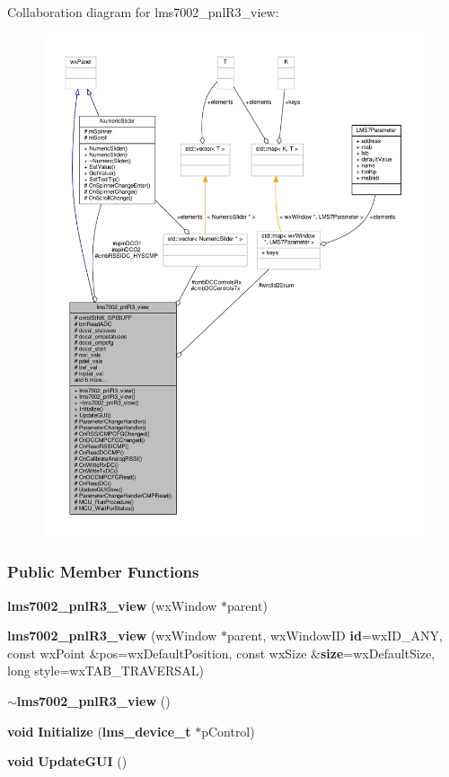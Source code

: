 Collaboration diagram for lms7002\+\_\+pnl\+R3\+\_\+view\+:
\nopagebreak
\begin{figure}[H]
\begin{center}
\leavevmode
\includegraphics[width=350pt]{d9/da1/classlms7002__pnlR3__view__coll__graph}
\end{center}
\end{figure}
\subsubsection*{Public Member Functions}
\begin{DoxyCompactItemize}
\item 
{\bf lms7002\+\_\+pnl\+R3\+\_\+view} (wx\+Window $\ast$parent)
\item 
{\bf lms7002\+\_\+pnl\+R3\+\_\+view} (wx\+Window $\ast$parent, wx\+Window\+ID {\bf id}=wx\+I\+D\+\_\+\+A\+NY, const wx\+Point \&pos=wx\+Default\+Position, const wx\+Size \&{\bf size}=wx\+Default\+Size, long style=wx\+T\+A\+B\+\_\+\+T\+R\+A\+V\+E\+R\+S\+AL)
\item 
{\bf $\sim$lms7002\+\_\+pnl\+R3\+\_\+view} ()
\item 
{\bf void} {\bf Initialize} ({\bf lms\+\_\+device\+\_\+t} $\ast$p\+Control)
\item 
{\bf void} {\bf Update\+G\+UI} ()
\end{DoxyCompactItemize}
